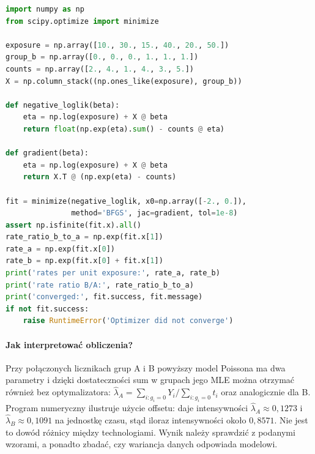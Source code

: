 \documentclass[11pt,a4paper,oneside]{report}
\numberwithin{equation}{chapter}
\theoremstyle{plain}
\theoremstyle{definition}
\theoremstyle{remark}
\begin{document}
\begin{lstlisting}[language=Python,caption={Kompletny program: MLE intensywności i offset w modelu Poissona (SciPy).}]
import numpy as np
from scipy.optimize import minimize

exposure = np.array([10., 30., 15., 40., 20., 50.])
group_b = np.array([0., 0., 0., 1., 1., 1.])
counts = np.array([2., 4., 1., 4., 3., 5.])
X = np.column_stack((np.ones_like(exposure), group_b))

def negative_loglik(beta):
    eta = np.log(exposure) + X @ beta
    return float(np.exp(eta).sum() - counts @ eta)

def gradient(beta):
    eta = np.log(exposure) + X @ beta
    return X.T @ (np.exp(eta) - counts)

fit = minimize(negative_loglik, x0=np.array([-2., 0.]),
               method='BFGS', jac=gradient, tol=1e-8)
assert np.isfinite(fit.x).all()
rate_ratio_b_to_a = np.exp(fit.x[1])
rate_a = np.exp(fit.x[0])
rate_b = np.exp(fit.x[0] + fit.x[1])
print('rates per unit exposure:', rate_a, rate_b)
print('rate ratio B/A:', rate_ratio_b_to_a)
print('converged:', fit.success, fit.message)
if not fit.success:
    raise RuntimeError('Optimizer did not converge')
\end{lstlisting}

\paragraph{Jak interpretować obliczenia?}
Przy połączonych licznikach grup A i B powyższy model
Poissona ma dwa parametry i dzięki dostateczności sum
w grupach jego MLE można otrzymać również bez optymalizatora:
$\widehat\lambda_A=\sum_{i:g_i=0}Y_i/
\sum_{i:g_i=0}t_i$ oraz analogicznie dla B.
Program numeryczny ilustruje użycie offsetu: daje intensywności
$\widehat\lambda_A\approx0{,}1273$ i
$\widehat\lambda_B\approx0{,}1091$ na jednostkę
czasu, stąd iloraz intensywności około $0{,}8571$.
Nie jest to dowód różnicy między technologiami.
Wynik należy sprawdzić z podanymi wzorami, a ponadto
zbadać, czy wariancja danych odpowiada modelowi.
\end{document}

